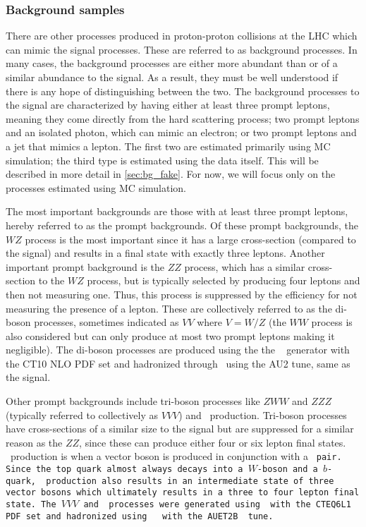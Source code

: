 \subsubsection{Background samples}
\label{sec:www_bg_samples}

There are other processes produced in proton-proton collisions at the LHC
which can mimic the signal processes. These are referred to as background processes.
In many cases, the background processes are either
more abundant than or of a similar abundance to
the signal. As a result, they must be well understood if there is any hope
of distinguishing between the two. The background processes to the signal
are characterized by having either at least three prompt leptons, meaning they
come directly from the hard scattering process;  
two prompt leptons and an isolated photon, which can mimic an electron;
or two prompt leptons and a jet that mimics a lepton.
The first two are estimated primarily using MC simulation; the third type
is estimated using the data itself. 
This will be described in more detail in \sec\ref{sec:bg_fake}.
For now, we will focus only on the processes estimated using MC simulation.

The most important backgrounds are those with at least three prompt leptons, 
hereby referred to as the prompt backgrounds. Of these prompt backgrounds,
the $WZ$ process is the most important since it has a 
large cross-section (compared to the signal)
and results in a final state with exactly three leptons. Another important 
prompt background is the $ZZ$ process,
which has a similar cross-section to the $WZ$ process, but is typically 
selected by producing
four leptons and then not measuring one. Thus, this process is suppressed by the 
efficiency for not measuring the presence of a lepton. 
These are collectively referred to as the di-boson processes, sometimes
indicated as $VV$ where $V=W/Z$ (the $WW$ process is also considered
but can only produce at most two prompt leptons making it negligible). 
The di-boson processes are produced using the 
the \powheg~\cite{Alioli:2008gx,Nason:2004rx,Frixione:2007vw,Alioli:2010xd} generator
with the CT10 NLO PDF set and 
hadronized through \pythiaeight~using the AU2 tune, same as the signal.

Other prompt backgrounds 
include tri-boson processes like $ZWW$ and $ZZZ$ 
(typically referred to collectively as $VVV$)
and \ttV~production. Tri-boson processes
have cross-sections of a similar size to the signal but are suppressed 
for a similar reason
as the $ZZ$, since these can produce either four or six lepton final 
states. 
\ttV~production is when a vector
boson is produced in conjunction with a \tt~pair. 
Since the top quark almost always decays
into a $W$-boson and a $b$-quark, \ttV~production also results in an intermediate
state of three vector bosons which ultimately results in a three to four lepton
final state.
The $VVV$ and \ttV~processes were generated using \madgraph~with the 
CTEQ6L1 PDF set and hadronized
using \pythiasix~\cite{PYTHIA} with the AUET2B~\cite{atlas:2011zja} 
tune.

